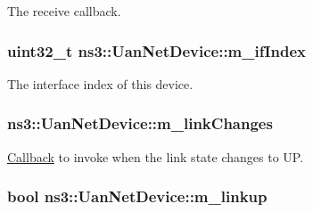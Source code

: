 The receive callback. 

\subsubsection[{\texorpdfstring{m\+\_\+if\+Index}{m_ifIndex}}]{\setlength{\rightskip}{0pt plus 5cm}uint32\+\_\+t ns3\+::\+Uan\+Net\+Device\+::m\+\_\+if\+Index\hspace{0.3cm}{\ttfamily [private]}}\hypertarget{classns3_1_1UanNetDevice_a3416bb182a67acc209637bfe619a76f6}{}\label{classns3_1_1UanNetDevice_a3416bb182a67acc209637bfe619a76f6}


The interface index of this device. 

\subsubsection[{\texorpdfstring{m\+\_\+link\+Changes}{m_linkChanges}}]{ ns3\+::\+Uan\+Net\+Device\+::m\+\_\+link\+Changes\hspace{0.3cm}{\ttfamily [private]}}\hypertarget{classns3_1_1UanNetDevice_ab061747ef6929cb5ba1288d68ab5a679}{}\label{classns3_1_1UanNetDevice_ab061747ef6929cb5ba1288d68ab5a679}


\hyperlink{classns3_1_1Callback}{Callback} to invoke when the link state changes to UP. 

\subsubsection[{\texorpdfstring{m\+\_\+linkup}{m_linkup}}]{\setlength{\rightskip}{0pt plus 5cm}bool ns3\+::\+Uan\+Net\+Device\+::m\+\_\+linkup\hspace{0.3cm}{\ttfamily [private]}}\hypertarget{classns3_1_1UanNetDevice_a983f3b724d8d8926b09e9228d0b5a7b2}{}\label{classns3_1_1UanNetDevice_a983f3b724d8d8926b09e9228d0b5a7b2}


